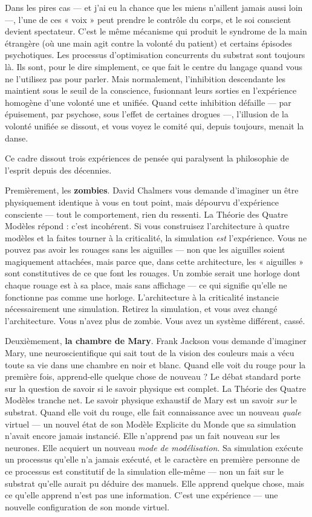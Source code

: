\documentclass[11pt, twoside, openright]{book}
\begin{document}
Dans les pires cas --- et j'ai eu la chance que les miens n'aillent jamais aussi loin ---, l'une de ces « voix » peut prendre le contrôle du corps, et le soi conscient devient spectateur. C'est le même mécanisme qui produit le syndrome de la main étrangère (où une main agit contre la volonté du patient) et certains épisodes psychotiques. Les processus d'optimisation concurrents du substrat sont toujours là. Ils sont, pour le dire simplement, ce que fait le centre du langage quand vous ne l'utilisez pas pour parler. Mais normalement, l'inhibition descendante les maintient sous le seuil de la conscience, fusionnant leurs sorties en l'expérience homogène d'une volonté une et unifiée. Quand cette inhibition défaille --- par épuisement, par psychose, sous l'effet de certaines drogues ---, l'illusion de la volonté unifiée se dissout, et vous voyez le comité qui, depuis toujours, menait la danse.

Ce cadre dissout trois expériences de pensée qui paralysent la philosophie de l'esprit depuis des décennies.

Premièrement, les \textbf{zombies}. David Chalmers vous demande d'imaginer un être physiquement identique à vous en tout point, mais dépourvu d'expérience consciente --- tout le comportement, rien du ressenti. La Théorie des Quatre Modèles répond : c'est incohérent. Si vous construisez l'architecture à quatre modèles et la faites tourner à la criticalité, la simulation \textit{est} l'expérience. Vous ne pouvez pas avoir les rouages sans les aiguilles --- non que les aiguilles soient magiquement attachées, mais parce que, dans cette architecture, les « aiguilles » sont constitutives de ce que font les rouages. Un zombie serait une horloge dont chaque rouage est à sa place, mais sans affichage --- ce qui signifie qu'elle ne fonctionne pas comme une horloge. L'architecture à la criticalité instancie nécessairement une simulation. Retirez la simulation, et vous avez changé l'architecture. Vous n'avez plus de zombie. Vous avez un système différent, cassé.

Deuxièmement, \textbf{la chambre de Mary}. Frank Jackson vous demande d'imaginer Mary, une neuroscientifique qui sait tout de la vision des couleurs mais a vécu toute sa vie dans une chambre en noir et blanc. Quand elle voit du rouge pour la première fois, apprend-elle quelque chose de nouveau ? Le débat standard porte sur la question de savoir si le savoir physique est complet. La Théorie des Quatre Modèles tranche net. Le savoir physique exhaustif de Mary est un savoir \textit{sur} le substrat. Quand elle voit du rouge, elle fait connaissance avec un nouveau \textit{quale} virtuel --- un nouvel état de son Modèle Explicite du Monde que sa simulation n'avait encore jamais instancié. Elle n'apprend pas un fait nouveau sur les neurones. Elle acquiert un nouveau \textit{mode de modélisation}. Sa simulation exécute un processus qu'elle n'a jamais exécuté, et le caractère en première personne de ce processus est constitutif de la simulation elle-même --- non un fait sur le substrat qu'elle aurait pu déduire des manuels. Elle apprend quelque chose, mais ce qu'elle apprend n'est pas une information. C'est une expérience --- une nouvelle configuration de son monde virtuel.
\end{document}

